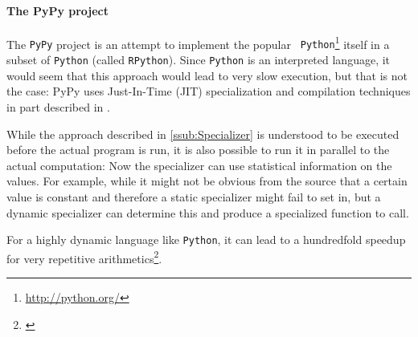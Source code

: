 \paragraph{The PyPy project} %
\label{par:The PyPy project}
\begin{example}
	The {\tt PyPy} project is an attempt to implement the popular {\tt
	Python}\footnote{\url{http://python.org/}} itself in a subset of {\tt Python}
	(called {\tt RPython}). Since {\tt Python} is an interpreted language, it
	would seem that this approach would lead to very slow execution, but that is
	not the case: PyPy uses Just-In-Time (JIT) specialization and compilation
	techniques in part described in \cite{psycho}.

	While the approach described in \ref{ssub:Specializer} is understood to be 
	executed before the actual program is run, it is also possible to run it 
	in parallel to the actual computation: Now the specializer can use 
	statistical information on the values. For example, while it might not be 
	obvious from the source that a certain value is constant and therefore a 
	static specializer might fail to set in, but a dynamic specializer can 
	determine this and produce a specialized function to call.

	For a highly dynamic language like {\tt Python}, it can lead to a hundredfold 
	speedup for very repetitive arithmetics\footnote{\cite{psycho}}.
\end{example}


